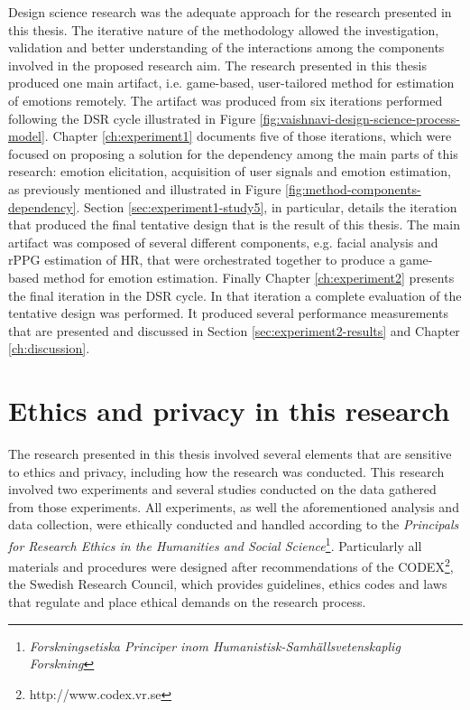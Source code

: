 Design science research was the adequate approach for the research presented in this thesis. The iterative nature of the methodology allowed the investigation, validation and better understanding of the interactions among the components involved in the proposed research aim. The research presented in this thesis produced one main artifact, i.e. game-based, user-tailored method for estimation of emotions remotely. The artifact was produced from six iterations performed following the DSR cycle illustrated in Figure \ref{fig:vaishnavi-design-science-process-model}. Chapter \ref{ch:experiment1} documents five of those iterations, which were focused on proposing a solution for the dependency among the main parts of this research: emotion elicitation, acquisition of user signals and emotion estimation, as previously mentioned and illustrated in Figure \ref{fig:method-components-dependency}. Section \ref{sec:experiment1-study5}, in particular, details the iteration that produced the final tentative design that is the result of this thesis. The main artifact was composed of several different components, e.g. facial analysis and rPPG estimation of HR, that were orchestrated together to produce a game-based method for emotion estimation. Finally Chapter \ref{ch:experiment2} presents the final iteration in the DSR cycle. In that iteration a complete evaluation of the tentative design was performed. It produced several performance measurements that are presented and discussed in Section \ref{sec:experiment2-results} and Chapter \ref{ch:discussion}.

\section{Ethics and privacy in this research}
\label{sec:ethics-this-research}

The research presented in this thesis involved several elements that are sensitive to ethics and privacy, including how the research was conducted. This research involved two experiments and several studies conducted on the data gathered from those experiments. All experiments, as well the aforementioned analysis and data collection, were ethically conducted and handled according to the \textit{Principals for Research Ethics in the Humanities and Social Science}\footnote{\textit{Forskningsetiska Principer inom Humanistisk-Samhällsvetenskaplig Forskning}}. Particularly all materials and procedures were designed after recommendations of the CODEX\footnote{http://www.codex.vr.se}, the Swedish Research Council, which provides guidelines, ethics codes and laws that regulate and place ethical demands on the research process.

